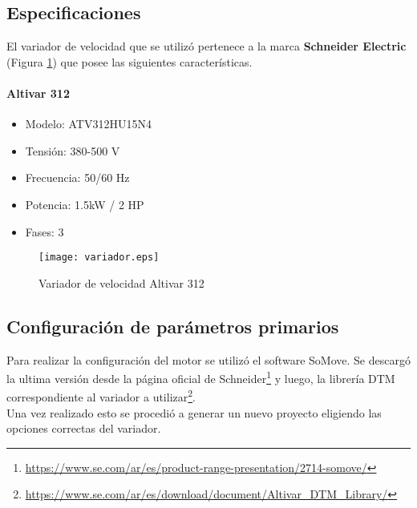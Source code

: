 \subsection{Especificaciones}
El variador de velocidad que se utilizó pertenece a la marca \textbf{Schneider Electric} (Figura \ref{fig:variador}) que posee las siguientes características. \\
	\paragraph*{Altivar 312}
	\begin{itemize}
		\item 	Modelo: ATV312HU15N4
		\item   Tensión: 380-500 V
		\item 	Frecuencia: 50/60 Hz
		\item 	Potencia: 1.5kW / 2 HP
		\item 	Fases: 3
	\end{itemize}

	\begin{figure}[h!]
		\centering
		\texttt{[image: variador.eps]}
		\caption{Variador de velocidad Altivar 312}
		\label{fig:variador}
	\end{figure}


	\subsection{Configuración de parámetros primarios}
	Para realizar la configuración del motor se utilizó el software SoMove. Se descargó la ultima versión desde la página oficial de Schneider\footnote{\url{https://www.se.com/ar/es/product-range-presentation/2714-somove/}} y luego, la librería DTM correspondiente al variador a utilizar\footnote{\url{https://www.se.com/ar/es/download/document/Altivar_DTM_Library/}}. 
	\\
	Una vez realizado esto se procedió a generar un nuevo proyecto eligiendo las opciones correctas del variador.
	
	
	\newpage

